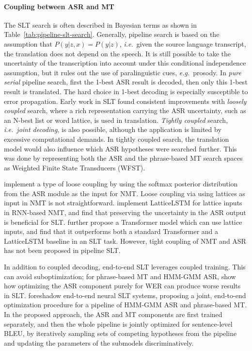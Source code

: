 \documentclass{svjour3}
\newcommand{\ie}[1]{\textit{i.e.}~#1}
\newcommand{\eg}[1]{\textit{e.g.}~#1}
\begin{document}
\paragraph{\textbf{Coupling between ASR and MT}}

The SLT search is often described in Bayesian terms as shown in Table~\ref{tab:pipeline-slt-search}. Generally, pipeline search is based on the assumption that $P(y|z,x) = P(y|z)$, \ie given the source language transcript, the translation does not depend on the speech. It is still possible to take the uncertainty of the transcription into account under this conditional independence assumption, but it rules out the use of paralinguistic cues, \eg prosody.
In \emph{pure serial} pipeline search, first the 1-best ASR result is decoded, then only this 1-best result is translated. The hard choice in 1-best decoding is especially susceptible to error propagation. Early work in SLT found consistent improvements with \emph{loosely coupled} search, where a rich representation carrying the ASR uncertainty, such as an N-best list or word lattice, is used in translation. \emph{Tightly coupled} search, \ie \emph{joint decoding}, is also possible, although the application is limited by excessive computational demands. In tightly coupled search, the translation model would also influence which ASR hypotheses were searched further. This was done by representing both the ASR and the phrase-based MT search spaces as Weighted Finite State Transducers (WFST).~\citep{matusov2006integrating,zhou2013smt}

\citet{osamura2018using} implement a type of loose coupling by using the softmax posterior distribution from the ASR module as the input for NMT. Loose coupling via using lattices as input in NMT is not straightforward. \citet{sperber-etal-2017-neural} implement LatticeLSTM for lattice inputs in RNN-based NMT, and find that  preserving the uncertainty in the ASR output is beneficial for SLT. \citet{zhang-etal-2019-lattice} further propose a Transformer model which can use lattice inputs, and find that it outperforms both a standard Transformer and a LatticeLSTM baseline in an SLT task. However, tight coupling of NMT and ASR has not been proposed in pipeline SLT.

In addition to coupled decoding, end-to-end SLT leverages coupled training. This can avoid suboptimization; for phrase-based MT and HMM-GMM ASR, \citet{he2011wer} show how optimizing the ASR component purely for WER can produce worse results in SLT. \citet{he2013speech} foreshadow end-to-end neural SLT systems, proposing a joint, end-to-end optimization procedure for a pipeline of HMM-GMM ASR and phrase-based MT. In the proposed approach, the ASR and MT components are first trained separately, and then the whole pipeline is jointly optimized for sentence-level BLEU, by iteratively sampling sets of competing hypotheses from the pipeline and updating the parameters of the submodels discriminatively.
\end{document}
